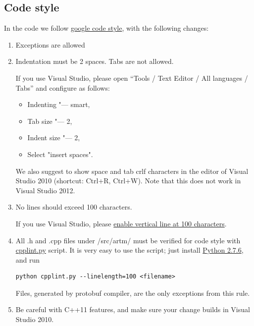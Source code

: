 \documentclass[11pt,a4paper,twoside]{report}
\begin{document}
\subsection{Code style}
\label{label:code_style}
In the code we follow
\href{http://google-styleguide.googlecode.com/svn/trunk/cppguide.xml}{google code style},
with the following changes:
\begin{enumerate}
    \item Exceptions are allowed
    \item Indentation must be 2 spaces. Tabs are not allowed.

      If you use Visual Studio,
      please open ``Tools / Text Editor / All languages / Tabs''
      and configure as follows:
      \begin{itemize}
          \item Indenting "--- smart,
          \item Tab size "--- 2,
          \item Indent size "--- 2,
          \item Select "insert spaces".
      \end{itemize}

      We also suggest to show space and tab crlf characters
      in the editor of Visual Studio 2010 (shortcut: Ctrl+R, Ctrl+W).
      Note that this does not work in Visual Studio 2012.

\item No lines should exceed 100 characters.

      If you use Visual Studio, please \href{http://stackoverflow.com/questions/9894397/100-characters-line-marker-in-visual-studio}{enable
       vertical line at 100 characters}.

\item All .h and .cpp files under /src/artm/ must be verified for code style with
      \href{http://google-styleguide.googlecode.com/svn/trunk/cpplint/cpplint.py}{cpplint.py} script.
      It is very easy to use the script; just install
      \href{http://www.python.org/downloads/}{Python 2.7.6}, and run

\begin{verbatim}
python cpplint.py --linelength=100 <filename>
\end{verbatim}
      Files, generated by protobuf compiler, are the only exceptions from this rule.

\item Be careful with C++11 features, and make sure your change builds in Visual Studio 2010.

\end{enumerate}
\end{document}
